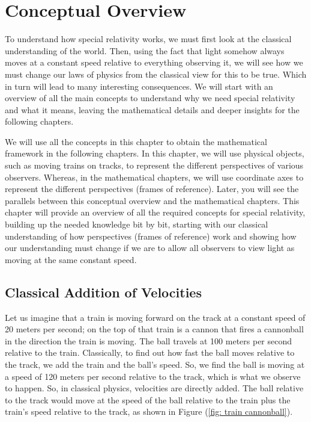 \mainmatter
\chapter{Conceptual Overview}

To understand how special relativity works, we must first look at the classical understanding of the world.
Then, using the fact that light somehow always moves at a constant speed relative to everything observing it, we will see how we must change our laws of physics from the classical view for this to be true.
Which in turn will lead to many interesting consequences.
We will start with an overview of all the main concepts to understand why we need special relativity and what it means, leaving the mathematical details and deeper insights for the following chapters.

We will use all the concepts in this chapter to obtain the mathematical framework in the following chapters.
In this chapter, we will use physical objects, such as moving trains on tracks, to represent the different perspectives of various observers.
Whereas, in the mathematical chapters, we will use coordinate axes to represent the different perspectives (frames of reference).
Later, you will see the parallels between this conceptual overview and the mathematical chapters.
This chapter will provide an overview of all the required concepts for special relativity, building up the needed knowledge bit by bit, starting with our classical understanding of how perspectives (frames of reference) work and showing how our understanding must change if we are to allow all observers to view light as moving at the same constant speed.

\section{Classical Addition of Velocities}\label{Sect: classical velocity addition}

Let us imagine that a train is moving forward on the track at a constant speed of 20 meters per second; on the top of that train is a cannon that fires a cannonball in the direction the train is moving.
The ball travels at 100 meters per second relative to the train.
Classically, to find out how fast the ball moves relative to the track, we add the train and the ball's speed.
So, we find the ball is moving at a speed of 120 meters per second relative to the track, which is what we observe to happen.
So, in classical physics, velocities are directly added.
The ball relative to the track would move at the speed of the ball relative to the train plus the train's speed relative to the track, as shown in Figure (\ref{fig: train cannonball}).

